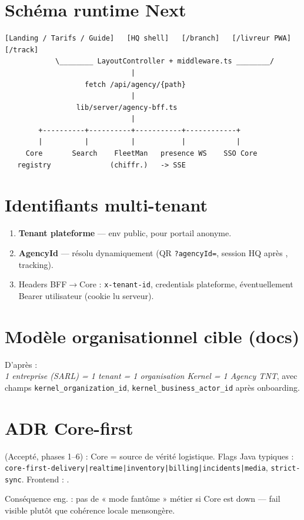 
\section{Schéma runtime Next}

\begin{lstlisting}
[Landing / Tarifs / Guide]   [HQ shell]   [/branch]   [/livreur PWA]   [/track]
            \________ LayoutController + middleware.ts ________/
                              |
                   fetch /api/agency/{path}
                              |
                 lib/server/agency-bff.ts
                              |
        +----------+----------+-----------+------------+
        |          |          |           |            |
     Core       Search    FleetMan   presence WS    SSO Core
   registry              (chiffr.)   -> SSE
\end{lstlisting}

\section{Identifiants multi-tenant}

\begin{enumerate}
  \item \textbf{Tenant plateforme} --- env public, pour portail anonyme.
  \item \textbf{AgencyId} --- résolu dynamiquement (QR \texttt{?agencyId=},
        session HQ après , tracking).
  \item Headers BFF$\rightarrow$Core : \texttt{x-tenant-id}, credentials
        plateforme, éventuellement Bearer utilisateur (cookie lu serveur).
\end{enumerate}

\section{Modèle organisationnel cible (docs)}

D'après  : \\
\textit{1 entreprise (SARL) = 1 tenant = 1 organisation Kernel = 1 Agency TNT},
avec champs \texttt{kernel\_organization\_id}, \texttt{kernel\_business\_actor\_id}
après onboarding.

\section{ADR Core-first}

 (Accepté, phases 1--6) : Core = source
de vérité logistique. Flags Java typiques :
\texttt{core-first-delivery|realtime|inventory|billing|incidents|media},
\texttt{strict-sync}. Frontend : .

Conséquence eng. : pas de « mode fantôme » métier si Core est down --- fail
visible plutôt que cohérence locale mensongère.
